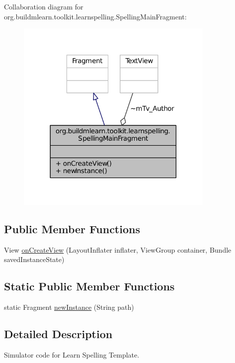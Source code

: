 Collaboration diagram for org.\-buildmlearn.\-toolkit.\-learnspelling.\-Spelling\-Main\-Fragment\-:
\nopagebreak
\begin{figure}[H]
\begin{center}
\leavevmode
\includegraphics[width=270pt]{db/d72/classorg_1_1buildmlearn_1_1toolkit_1_1learnspelling_1_1SpellingMainFragment__coll__graph}
\end{center}
\end{figure}
\subsection*{Public Member Functions}
\begin{DoxyCompactItemize}
\item 
View \hyperlink{classorg_1_1buildmlearn_1_1toolkit_1_1learnspelling_1_1SpellingMainFragment_a631d158eb635f9f7c5cc31459e3aa448}{on\-Create\-View} (Layout\-Inflater inflater, View\-Group container, Bundle saved\-Instance\-State)
\end{DoxyCompactItemize}
\subsection*{Static Public Member Functions}
\begin{DoxyCompactItemize}
\item 
static Fragment \hyperlink{classorg_1_1buildmlearn_1_1toolkit_1_1learnspelling_1_1SpellingMainFragment_a9dc5bc1a66f73d325039fd8f5ba819c3}{new\-Instance} (String path)
\end{DoxyCompactItemize}


\subsection{Detailed Description}
Simulator code for Learn Spelling Template. 

